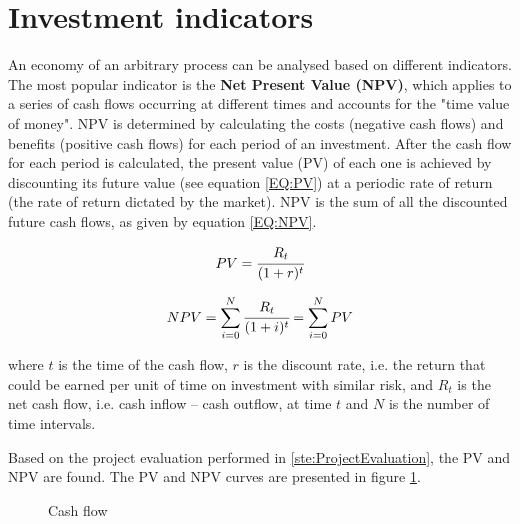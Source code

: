 	\newpage
	\section{Investment indicators}
	
	An economy of an arbitrary process can be analysed based on different indicators. The most popular indicator is the \textbf{Net Present Value (NPV)}, which applies to a series of cash flows occurring at different times and accounts for the "time value of money". NPV is determined by calculating the costs (negative cash flows) and benefits (positive cash flows) for each period of an investment. After the cash flow for each period is calculated, the present value (PV) of each one is achieved by discounting its future value (see equation \ref{EQ:PV}) at a periodic rate of return (the rate of return dictated by the market). NPV is the sum of all the discounted future cash flows, as given by equation \ref{EQ:NPV}.
	
	\begin{equation}
		PV = \cfrac{R_t}{(1+r)^t}
		\label{EQ:PV}
	\end{equation}

	\begin{equation}
		NPV = \sum_{i=0}^{N} \cfrac{R_{t}}{(1+i)^t} = \sum_{i=0}^{N} PV
		\label{EQ:NPV}
	\end{equation}

	where $t$ is the time of the cash flow, $r$ is the discount rate, i.e. the return that could be earned per unit of time on investment with similar risk, and $R_{t}$ is the net cash flow, i.e. cash inflow – cash outflow, at time $t$ and $N$ is the number of time intervals.
	
	Based on the project evaluation performed in \ref{ste:ProjectEvaluation}, the PV and NPV are found. The PV and NPV curves are presented in figure \ref{fig:CashFlow}.
	
	\begin{figure}[h!]
		\centering
	\caption{Cash flow}
	\label{fig:CashFlow}
	\end{figure}

